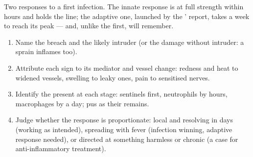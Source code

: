 \begin{omfigure}

{\small Two responses to a first infection. The innate response is at
full strength within hours and holds the line; the adaptive one,
launched by the ' report, takes a week to reach its
peak --- and, unlike the first, will remember.}
\end{omfigure}

\begin{method}\label{met:g12:innate-immunity:read}
\begin{enumerate}
  \item Name the breach and the likely intruder (or the damage without
        intruder: a sprain inflames too).
  \item Attribute each sign to its mediator and vessel change:
        redness and heat to widened vessels, swelling to leaky ones,
        pain to sensitised nerves.
  \item Identify the  present at each stage: sentinels first,
        neutrophils by hours, macrophages by a day; pus as their
        remains.
  \item Judge whether the response is proportionate: local and
        resolving in days (working as intended), spreading with fever
        (infection winning, adaptive response needed), or directed at
        something harmless or chronic (a case for anti-inflammatory
        treatment).
\end{enumerate}
\end{method}

